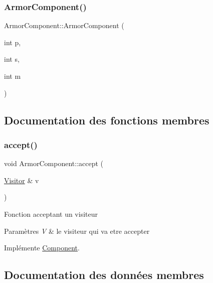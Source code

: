 \subsubsection{\texorpdfstring{Armor\+Component()}{ArmorComponent()}}
{\footnotesize\ttfamily Armor\+Component\+::\+Armor\+Component (\begin{DoxyParamCaption}\item[{int}]{p,  }\item[{int}]{s,  }\item[{int}]{m }\end{DoxyParamCaption})\hspace{0.3cm}{\ttfamily [inline]}}



\subsection{Documentation des fonctions membres}
\mbox{\label{structArmorComponent_aac5863d4195fe056fbb0a2a0af17b6e0}} 
\subsubsection{\texorpdfstring{accept()}{accept()}}
{\footnotesize\ttfamily void Armor\+Component\+::accept (\begin{DoxyParamCaption}\item[{\hyperlink{classVisitor}{Visitor} \&}]{v }\end{DoxyParamCaption})\hspace{0.3cm}{\ttfamily [virtual]}}

Fonction acceptant un visiteur


\begin{DoxyParams}{Paramètres}
{\em V} & le visiteur qui va etre accepter \\
\hline
\end{DoxyParams}


Implémente \hyperlink{structComponent_a1d42068fda4a9bf6571810f669b3bb21}{Component}.



\subsection{Documentation des données membres}
\mbox{\label{structArmorComponent_a88e4b9e35be500896af52d24942e7465}} 
